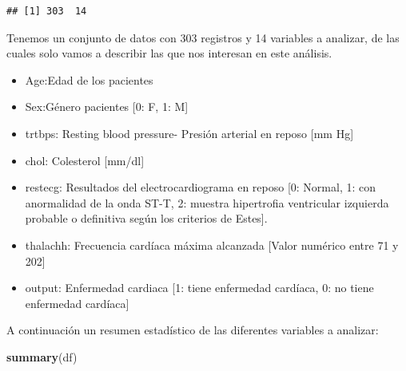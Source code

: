 \documentclass[
]{article}
\newenvironment{Shaded}{\begin{snugshade}}{\end{snugshade}}
\newcommand{\FunctionTok}[1]{\textcolor[rgb]{0.13,0.29,0.53}{\textbf{#1}}}
\newcommand{\NormalTok}[1]{#1}
\begin{document}
\begin{verbatim}
## [1] 303  14
\end{verbatim}

Tenemos un conjunto de datos con 303 registros y 14 variables a
analizar, de las cuales solo vamos a describir las que nos interesan en
este análisis.

\begin{itemize}
  \item Age:Edad de los pacientes
  \item Sex:Género pacientes [0: F, 1: M]
  \item trtbps: Resting blood pressure- Presión arterial en reposo [mm Hg]
  \item chol: Colesterol [mm/dl]
  \item restecg: Resultados del electrocardiograma en reposo [0: Normal, 1: con anormalidad de la onda ST-T, 2: muestra hipertrofia ventricular izquierda probable o definitiva según los criterios de Estes].
  \item thalachh: Frecuencia cardíaca máxima alcanzada [Valor numérico entre 71 y 202]
  \item output: Enfermedad cardiaca [1: tiene enfermedad cardíaca, 0: no tiene enfermedad cardíaca]
\end{itemize}

A continuación un resumen estadístico de las diferentes variables a
analizar:

\begin{Shaded}
\begin{Highlighting}[]
\FunctionTok{summary}\NormalTok{(df)}
\end{Highlighting}
\end{Shaded}
\end{document}
